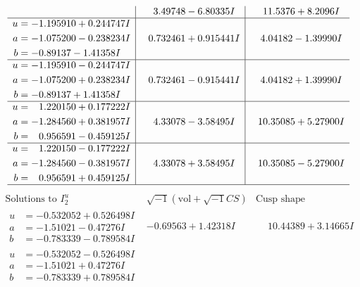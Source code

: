 \documentclass[1p]{elsarticle_modified}
\theoremstyle{definition}
\newcommand{\I}{\sqrt{-1}}
\begin{document}
$$\begin{array}{c|c|c}
 & \phantom{-}3.49748 - 6.80335 I & \phantom{-}11.5376 + 8.2096 I \\ \hline\begin{aligned}
u &= -1.195910 + 0.244747 I \\
a &= -1.075200 - 0.238234 I \\
b &= -0.89137 - 1.41358 I\end{aligned}
 & \phantom{-}0.732461 + 0.915441 I & \phantom{-}4.04182 - 1.39990 I \\ \hline\begin{aligned}
u &= -1.195910 - 0.244747 I \\
a &= -1.075200 + 0.238234 I \\
b &= -0.89137 + 1.41358 I\end{aligned}
 & \phantom{-}0.732461 - 0.915441 I & \phantom{-}4.04182 + 1.39990 I \\ \hline\begin{aligned}
u &= \phantom{-}1.220150 + 0.177222 I \\
a &= -1.284560 + 0.381957 I \\
b &= \phantom{-}0.956591 - 0.459125 I\end{aligned}
 & \phantom{-}4.33078 - 3.58495 I & \phantom{-}10.35085 + 5.27900 I \\ \hline\begin{aligned}
u &= \phantom{-}1.220150 - 0.177222 I \\
a &= -1.284560 - 0.381957 I \\
b &= \phantom{-}0.956591 + 0.459125 I\end{aligned}
 & \phantom{-}4.33078 + 3.58495 I & \phantom{-}10.35085 - 5.27900 I\\
 \hline 
 \end{array}$$\newpage$$\begin{array}{c|c|c}  
\text{Solutions to }I^u_{2}& \I (\text{vol} + \sqrt{-1}CS) & \text{Cusp shape}\\
 \hline 
\begin{aligned}
u &= -0.532052 + 0.526498 I \\
a &= -1.51021 - 0.47276 I \\
b &= -0.783339 - 0.789584 I\end{aligned}
 & -0.69563 + 1.42318 I & \phantom{-}10.44389 + 3.14665 I \\ \hline\begin{aligned}
u &= -0.532052 - 0.526498 I \\
a &= -1.51021 + 0.47276 I \\
b &= -0.783339 + 0.789584 I\end{aligned}

\end{array}$$
\end{document}
